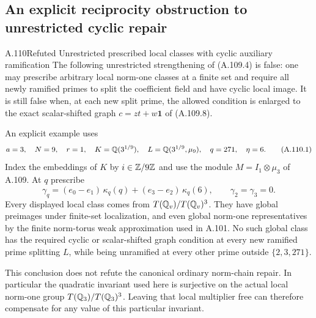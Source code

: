 \subsection{An explicit reciprocity obstruction to unrestricted cyclic repair}

\begin{statement}{A.110}{Refuted}
{Unrestricted prescribed local classes with cyclic auxiliary ramification}
The following unrestricted strengthening of (A.109.4) is false:
one may prescribe arbitrary local norm-one classes at a finite set
and require all newly ramified primes to split the coefficient field
and have cyclic local image.  It is still false when, at each new
split prime, the allowed condition is enlarged to the exact
scalar-shifted graph $c=zt+w\mathbf1$ of (A.109.8).

An explicit example uses
\[
 a=3,\quad N=9,\quad r=1,\quad
 K=\mathbb Q(3^{1/9}),\quad L=\mathbb Q(3^{1/9},\mu_9),\quad
                 q=271,\quad \eta=6.
 \tag{A.110.1}
\]
Index the embeddings of $K$ by $i\in\mathbb Z/9\mathbb Z$ and use the module
$M=I_1\otimes\mu_3$ of A.109.
At $q$ prescribe
\[
 \gamma_q=(e_0-e_1)\,\kappa_q(q)
                   +(e_3-e_2)\,\kappa_q(6),
                   \qquad \gamma_2=\gamma_3=0.
 \tag{A.110.2}
\]
Every displayed local class comes from $T(\mathbb Q_v)/T(\mathbb Q_v)^3$.
They have global preimages under finite-set localization,
and even global norm-one representatives by the finite norm-torus
weak approximation used in A.101.
No such global class has the required cyclic or scalar-shifted
graph condition at every new ramified prime splitting $L$,
while being unramified at every other prime outside
$\{2,3,271\}$.

This conclusion does not refute the canonical ordinary norm-chain
repair.  In particular the quadratic invariant used here is
surjective on the actual local norm-one group $T(\mathbb Q_3)/T(\mathbb Q_3)^3$.
Leaving that local multiplier free can therefore compensate for
any value of this particular invariant.
\end{statement}

